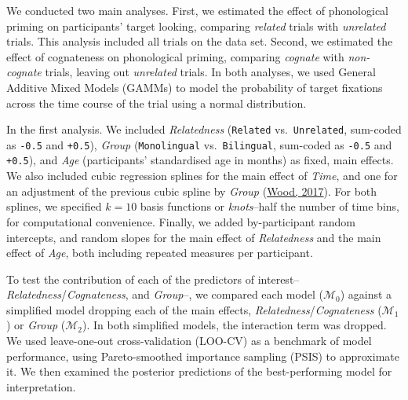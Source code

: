 \documentclass[
  letterpaper,
  DIV=11,
  numbers=noendperiod]{scrartcl}
\begin{document}
We conducted two main analyses. First, we estimated the effect of
phonological priming on participants' target looking, comparing
\emph{related} trials with \emph{unrelated} trials. This analysis
included all trials on the data set. Second, we estimated the effect of
cognateness on phonological priming, comparing \emph{cognate} with
\emph{non-cognate} trials, leaving out \emph{unrelated} trials. In both
analyses, we used General Additive Mixed Models (GAMMs) to model the
probability of target fixations across the time course of the trial
using a normal distribution.

In the first analysis. We included \emph{Relatedness} (\texttt{Related}
vs.~\texttt{Unrelated}, sum-coded as \texttt{-0.5} and \texttt{+0.5}),
\emph{Group} (\texttt{Monolingual} vs.~\texttt{Bilingual}, sum-coded as
\texttt{-0.5} and \texttt{+0.5}), and \emph{Age} (participants'
standardised age in months) as fixed, main effects. We also included
cubic regression splines for the main effect of \emph{Time}, and one for
an adjustment of the previous cubic spline by \emph{Group}
(\protect\hyperlink{ref-wood2017generalized}{Wood, 2017}). For both
splines, we specified \(k = 10\) basis functions or \emph{knots}--half
the number of time bins, for computational convenience. Finally, we
added by-participant random intercepts, and random slopes for the main
effect of \emph{Relatedness} and the main effect of \emph{Age}, both
including repeated measures per participant.

To test the contribution of each of the predictors of
interest--\emph{Relatedness}/\emph{Cognateness}, and \emph{Group}--, we
compared each model (\(\mathcal{M_0}\)) against a simplified model
dropping each of the main effects, \emph{Relatedness}/\emph{Cognateness}
(\(\mathcal{M}_1\)) or \emph{Group} (\(\mathcal{M_2}\)). In both
simplified models, the interaction term was dropped. We used
leave-one-out cross-validation (LOO-CV) as a benchmark of model
performance, using Pareto-smoothed importance sampling (PSIS) to
approximate it. We then examined the posterior predictions of the
best-performing model for interpretation.
\end{document}

